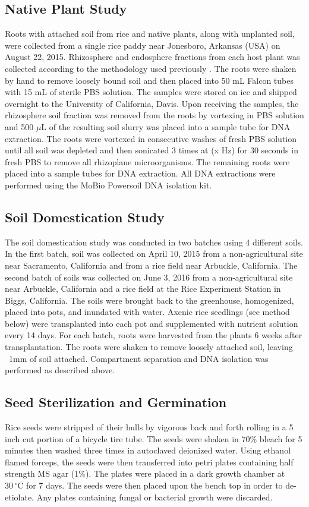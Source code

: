\subsection{Native Plant Study}
Roots with attached soil from rice and native plants, along with unplanted soil, were collected from a single rice paddy near Jonesboro, Arkansas (USA) on August 22, 2015. Rhizosphere and endosphere fractions from each host plant was collected according to the methodology used previously \cite{Edwards2015}. The roots were shaken by hand to remove loosely bound soil and then placed into 50 mL Falcon tubes with 15 mL of sterile PBS solution. The samples were stored on ice and shipped overnight to the University of California, Davis. Upon receiving the samples, the rhizosphere soil fraction was removed from the roots by vortexing in PBS solution and 500 $\mu$L of the resulting soil slurry was placed into a sample tube for DNA extraction. The roots were vortexed in consecutive washes of fresh PBS solution until all soil was depleted and then sonicated 3 times at (x Hz) for 30 seconds in fresh PBS to remove all rhizoplane microorganisms. The remaining roots were placed into a sample tubes for DNA extraction. All DNA extractions were performed using the MoBio Powersoil DNA isolation kit. 

\subsection{Soil Domestication Study}
The soil domestication study was conducted in two batches using 4 different soils. In the first batch, soil was collected on April 10, 2015 from a non-agricultural site near Sacramento, California and from a rice field near Arbuckle, California. The second batch of soils was collected on June 3, 2016 from a non-agricultural site near Arbuckle, California and a rice field at the Rice Experiment Station in Biggs, California. The soils were brought back to the greenhouse, homogenized, placed into pots, and inundated with water. Axenic rice seedlings (see method below) were transplanted into each pot and supplemented with nutrient solution every 14 days. For each batch, roots were harvested from the plants 6 weeks after transplantation. The roots were shaken to remove loosely attached soil, leaving ~1mm of soil attached. Compartment separation and DNA isolation was performed as described above.

\subsection{Seed Sterilization and Germination }
Rice seeds were stripped of their hulls by vigorous back and forth rolling in a 5 inch cut portion of a bicycle tire tube. The seeds were shaken in 70\% bleach for 5 minutes then washed three times in autoclaved deionized water. Using ethanol flamed forceps, the seeds were then transferred into petri plates containing half strength MS agar (1\%). The plates were placed in a dark growth chamber at $30\,^{\circ}\mathrm{C}$ for 7 days. The seeds were then placed upon the bench top in order to de-etiolate. Any plates containing fungal or bacterial growth were discarded.

